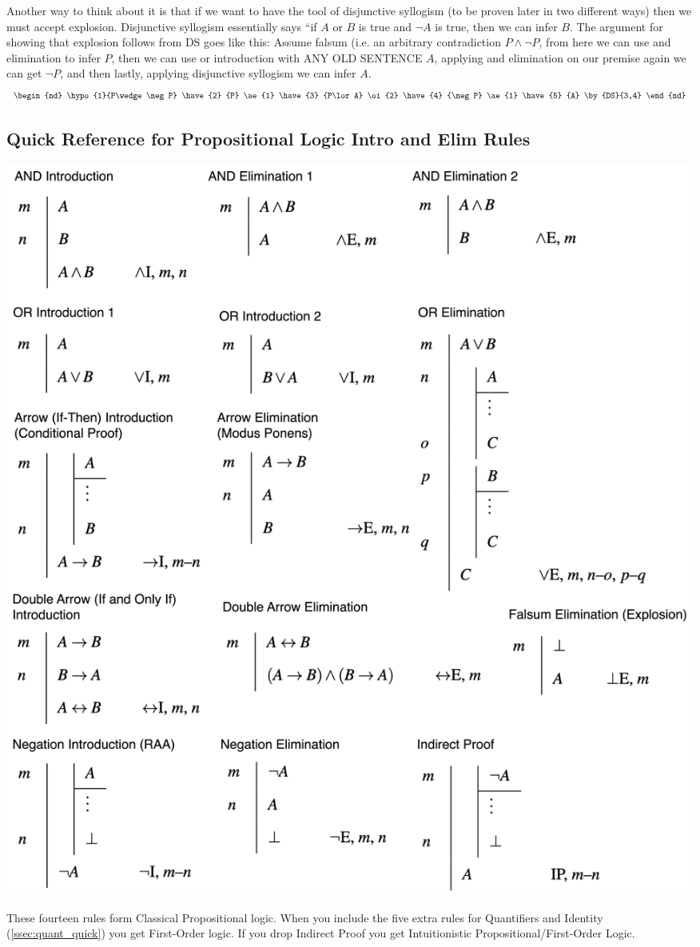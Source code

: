 Another way to think about it is that if we want to have the tool of disjunctive syllogism (to be proven later in two different ways) then we must accept explosion. Disjunctive syllogism essentially says ``if $A$ or $B$ is true and $\neg A$ is true, then we can infer $B$. The argument for showing that explosion follows from DS goes like this: Assume falsum (i.e. an arbitrary contradiction $P \wedge \neg P$, from here we can use and elimination to infer $P$, then we can use or introduction with ANY OLD SENTENCE $A$, applying and elimination on our premise again we can get $\neg P$, and then lastly, applying disjunctive syllogism we can infer $A$.
\begin{equation}
    \begin{nd}
        \hypo{1}{P\wedge \neg P}
        \have{2} {P} \ae{1}
        \have{3} {P\lor A} \oi{2}
        \have{4} {\neg P} \ae{1}
        \have{5} {A} \by{DS}{3,4}
    \end{nd} \nonumber
\end{equation}
\newpage
\begin{center}
    \subsection{ Quick Reference for Propositional Logic Intro and Elim Rules} \vspace{0.3in}
    \label{ssec:prop_quick}
    \includegraphics[width=1.1\textwidth]{Figures/Prop_rules_no_background.png}
\end{center}
These fourteen rules form Classical Propositional logic. When you include the five extra rules for Quantifiers and Identity (\ref{ssec:quant_quick}) you get First-Order logic. If you drop Indirect Proof you get Intuitionistic Propositional/First-Order Logic.
\newpage
